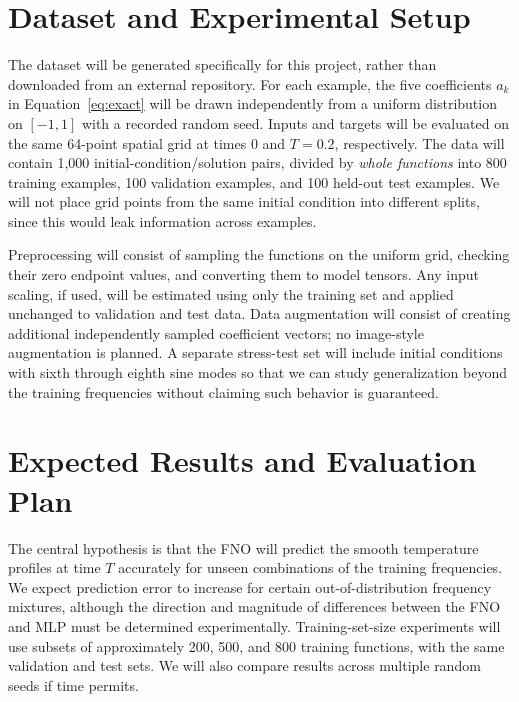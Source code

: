 \documentclass{article}
\begin{document}
\section{Dataset and Experimental Setup}
The dataset will be generated specifically for this project, rather than downloaded from an external repository. For each example, the five coefficients $a_k$ in Equation~\eqref{eq:exact} will be drawn independently from a uniform distribution on $[-1,1]$ with a recorded random seed. Inputs and targets will be evaluated on the same 64-point spatial grid at times $0$ and $T=0.2$, respectively. The data will contain 1,000 initial-condition/solution pairs, divided by \emph{whole functions} into 800 training examples, 100 validation examples, and 100 held-out test examples. We will not place grid points from the same initial condition into different splits, since this would leak information across examples.

Preprocessing will consist of sampling the functions on the uniform grid, checking their zero endpoint values, and converting them to model tensors. Any input scaling, if used, will be estimated using only the training set and applied unchanged to validation and test data. Data augmentation will consist of creating additional independently sampled coefficient vectors; no image-style augmentation is planned. A separate stress-test set will include initial conditions with sixth through eighth sine modes so that we can study generalization beyond the training frequencies without claiming such behavior is guaranteed.

\section{Expected Results and Evaluation Plan}
The central hypothesis is that the FNO will predict the smooth temperature profiles at time $T$ accurately for unseen combinations of the training frequencies. We expect prediction error to increase for certain out-of-distribution frequency mixtures, although the direction and magnitude of differences between the FNO and MLP must be determined experimentally. Training-set-size experiments will use subsets of approximately 200, 500, and 800 training functions, with the same validation and test sets. We will also compare results across multiple random seeds if time permits.
\end{document}
